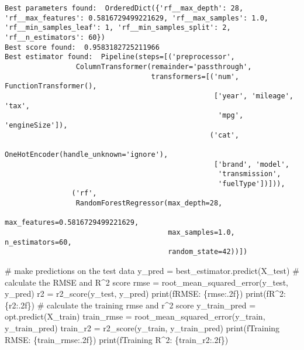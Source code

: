 \documentclass[
  letterpaper,
  DIV=11,
  numbers=noendperiod]{scrreprt}
\newenvironment{Shaded}{\begin{snugshade}}{\end{snugshade}}
\newcommand{\BuiltInTok}[1]{\textcolor[rgb]{0.00,0.23,0.31}{#1}}
\newcommand{\CommentTok}[1]{\textcolor[rgb]{0.37,0.37,0.37}{#1}}
\newcommand{\NormalTok}[1]{\textcolor[rgb]{0.00,0.23,0.31}{#1}}
\newcommand{\OperatorTok}[1]{\textcolor[rgb]{0.37,0.37,0.37}{#1}}
\newcommand{\SpecialCharTok}[1]{\textcolor[rgb]{0.37,0.37,0.37}{#1}}
\newcommand{\SpecialStringTok}[1]{\textcolor[rgb]{0.13,0.47,0.30}{#1}}
\begin{document}
\begin{verbatim}
Best parameters found:  OrderedDict({'rf__max_depth': 28, 'rf__max_features': 0.5816729499221629, 'rf__max_samples': 1.0, 'rf__min_samples_leaf': 1, 'rf__min_samples_split': 2, 'rf__n_estimators': 60})
Best score found:  0.9583182725211966
Best estimator found:  Pipeline(steps=[('preprocessor',
                 ColumnTransformer(remainder='passthrough',
                                   transformers=[('num', FunctionTransformer(),
                                                  ['year', 'mileage', 'tax',
                                                   'mpg', 'engineSize']),
                                                 ('cat',
                                                  OneHotEncoder(handle_unknown='ignore'),
                                                  ['brand', 'model',
                                                   'transmission',
                                                   'fuelType'])])),
                ('rf',
                 RandomForestRegressor(max_depth=28,
                                       max_features=0.5816729499221629,
                                       max_samples=1.0, n_estimators=60,
                                       random_state=42))])
\end{verbatim}

\begin{Shaded}
\begin{Highlighting}[]
\CommentTok{\# make predictions on the test data}
\NormalTok{y\_pred }\OperatorTok{=}\NormalTok{ best\_estimator.predict(X\_test)}
\CommentTok{\# calculate the RMSE and R\^{}2 score}
\NormalTok{rmse }\OperatorTok{=}\NormalTok{ root\_mean\_squared\_error(y\_test, y\_pred)}
\NormalTok{r2 }\OperatorTok{=}\NormalTok{ r2\_score(y\_test, y\_pred)}
\BuiltInTok{print}\NormalTok{(}\SpecialStringTok{f\textquotesingle{}RMSE: }\SpecialCharTok{\{}\NormalTok{rmse}\SpecialCharTok{:.2f\}}\SpecialStringTok{\textquotesingle{}}\NormalTok{)}
\BuiltInTok{print}\NormalTok{(}\SpecialStringTok{f\textquotesingle{}R\^{}2: }\SpecialCharTok{\{}\NormalTok{r2}\SpecialCharTok{:.2f\}}\SpecialStringTok{\textquotesingle{}}\NormalTok{)}
\CommentTok{\# calculate the training rmse and r\^{}2 score}
\NormalTok{y\_train\_pred }\OperatorTok{=}\NormalTok{ opt.predict(X\_train)}
\NormalTok{train\_rmse }\OperatorTok{=}\NormalTok{ root\_mean\_squared\_error(y\_train, y\_train\_pred)}
\NormalTok{train\_r2 }\OperatorTok{=}\NormalTok{ r2\_score(y\_train, y\_train\_pred)}
\BuiltInTok{print}\NormalTok{(}\SpecialStringTok{f\textquotesingle{}Training RMSE: }\SpecialCharTok{\{}\NormalTok{train\_rmse}\SpecialCharTok{:.2f\}}\SpecialStringTok{\textquotesingle{}}\NormalTok{)}
\BuiltInTok{print}\NormalTok{(}\SpecialStringTok{f\textquotesingle{}Training R\^{}2: }\SpecialCharTok{\{}\NormalTok{train\_r2}\SpecialCharTok{:.2f\}}\SpecialStringTok{\textquotesingle{}}\NormalTok{)}
\end{Highlighting}
\end{Shaded}
\end{document}
